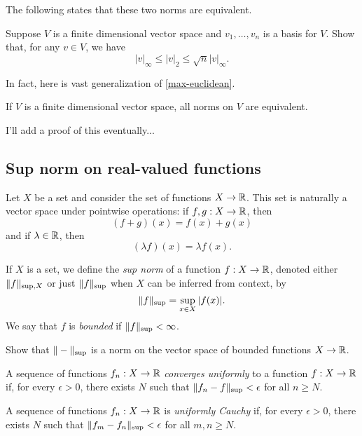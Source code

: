 The following states that these two norms are equivalent.  

\begin{exercise} \label{max-euclidean}
	Suppose $V$ is a finite dimensional vector space and $v_1, \dotsc, v_n$ is a basis for $V$. Show that, for any $v \in V$, we have \[ |v|_\infty \leq |v|_2 \leq \sqrt{n} |v|_\infty. \]
\end{exercise} 

In fact, here is vast generalization of \cref{max-euclidean}. 

\begin{theorem} \label{finite-dim-norm}
	If $V$ is a finite dimensional vector space, all norms on $V$ are equivalent.
\end{theorem}

{\color{blue} I'll add a proof of this eventually...}

\subsection{Sup norm on real-valued functions}

Let $X$ be a set and consider the set of functions $X \to \mathbb{R}$. This set is naturally a vector space under pointwise operations: if $f, g : X \to \mathbb{R}$, then
\[ (f+g)(x)= f(x) + g(x) \]
and if $\lambda \in \mathbb{R}$, then
\[ (\lambda f)(x) = \lambda f(x). \]

\begin{definition} \label{sup-norm}
	If $X$ is a set, we define the \emph{sup norm} of a function $f : X \to \mathbb{R}$, denoted either $\|f\|_{\mathrm{sup},X}$ or just $\|f\|_{\mathrm{sup}}$ when $X$ can be inferred from context, by
	\[ \|f\|_{\mathrm{sup}} = \sup_{x \in X} |f(x)|. \]
	We say that $f$ is \emph{bounded} if $\|f\|_{\mathrm{sup}} < \infty$. 
\end{definition}

\begin{exercise}
	Show that $\|-\|_{\mathrm{sup}}$ is a norm on the vector space of bounded functions $X \to \mathbb{R}$.
\end{exercise}

\begin{definition}
	A sequence of functions $f_n : X \to \mathbb{R}$ \emph{converges uniformly} to a function $f : X \to \mathbb{R}$ if, for every $\epsilon > 0$, there exists $N$ such that $\|f_n - f\|_{\mathrm{sup}} < \epsilon$ for all $n \geq N$. 
\end{definition}

\begin{definition}
	A sequence of functions $f_n : X \to \mathbb{R}$ is \emph{uniformly Cauchy} if, for every $\epsilon > 0$, there exists $N$ such that $\|f_m - f_n\|_{\mathrm{sup}} < \epsilon$ for all $m, n \geq N$. 
\end{definition}

